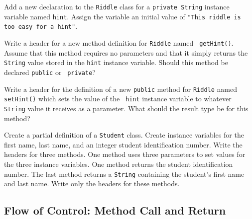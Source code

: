 \label{self-study-exercises}
\begin{SSTUDY}
\addtocounter{EXRcount}{2}\item
Add a new declaration to the {\tt Riddle} class for a {\tt private String}
instance variable named {\tt hint}. Assign the variable an initial value
of {\tt "This riddle is too easy for a hint"}.


\item
Write a header for a new method definition for {\tt Riddle} named {\tt
getHint()}. Assume that this method requires no parameters and that it
simply returns the {\tt String} value stored in the {\tt hint}
instance variable. Should this method be declared {\tt public} or {\tt
private}?


\item
Write a header for the definition of a new {\tt public} method for
{\tt Riddle} named {\tt setHint()} which sets the value of the {\tt
hint} instance variable to whatever {\tt String} value it receives as
a parameter.  What should the result type be for this method?

\item
Create a partial definition of a {\tt Student} class.  Create instance
variables for the first name, last name, and an integer student
identification number.  Write the headers for three methods.  One
method uses three parameters to set values for the three instance
variables. One method returns the student identification number.  The
last method returns a {\tt String} containing the student's first name
and last name.  Write only the headers for these methods.

\end{SSTUDY}




\subsection{Flow of Control: Method Call and Return}
\label{sec-methodcall}


